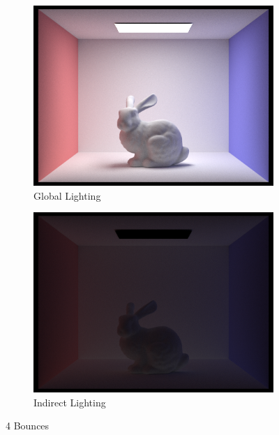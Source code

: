 \documentclass{article}
\begin{document}
\begin{figure}[htb!]
\begin{subfigure}[h]{0.4\textwidth}
\includegraphics[width=\textwidth]{task4/CBbunny_global_1024_4.png}
\caption{Global Lighting}
\end{subfigure}
\hfill\vrule\hfill
\begin{subfigure}[h]{0.4\textwidth}
\includegraphics[width=\textwidth]{task4/CBbunny_indirect_1024_4.png}
\caption{Indirect Lighting}
\end{subfigure}%

\caption[f2]{4 Bounces}
\end{figure}
\end{document}
